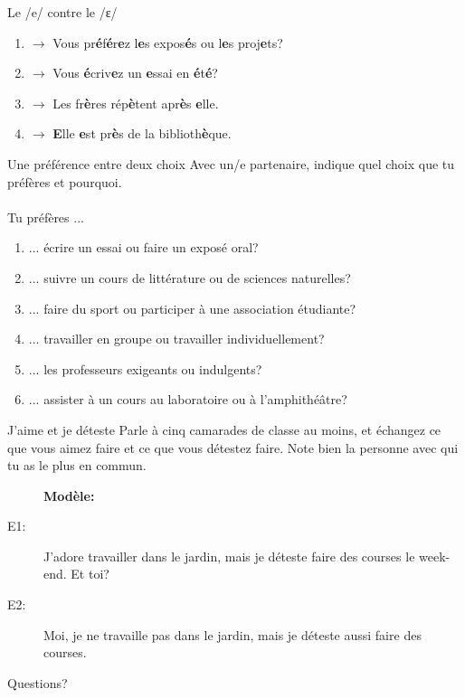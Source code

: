 \documentclass{beamer}
\begin{document}
  \begin{frame}{Le /e/ contre le /ɛ/}
    \begin{enumerate}
      \item[/e/] $\to$ Vous pr\textbf{é}f\textbf{é}r\textbf{e}z l\textbf{e}s expos\textbf{é}s ou l\textbf{e}s proj\textbf{e}ts?
      \item[/e/] $\to$ Vous \textbf{é}criv\textbf{e}z un \textbf{e}ssai en \textbf{é}t\textbf{é}?
      \item[/ɛ/] $\to$ Les fr\textbf{è}res rép\textbf{è}tent apr\textbf{è}s \textbf{e}lle.
      \item[/ɛ/] $\to$ \textbf{E}lle \textbf{e}st pr\textbf{è}s de la biblioth\textbf{è}que.
    \end{enumerate}
  \end{frame}

  \begin{frame}{Une préférence entre deux choix}
    Avec un/e partenaire, indique quel choix que tu préfères et pourquoi. \\
     \\
    \vspace{1cm}
    Tu préfères ...
    \begin{enumerate}
      \item ... écrire un essai ou faire un exposé oral?
      \item ... suivre un cours de littérature ou de sciences naturelles?
      \item ... faire du sport ou participer à une association étudiante?
      \item ... travailler en groupe ou travailler individuellement?
      \item ... les professeurs exigeants  ou indulgents?
      \item ... assister à un cours au laboratoire ou à l'amphithéâtre?
    \end{enumerate}
  \end{frame}

  \begin{frame}{J'aime et je déteste}
    Parle à cinq camarades de classe au moins, et échangez ce que vous aimez faire et ce que vous détestez faire.
    Note bien la personne avec qui tu as le plus en commun. \\
    \begin{center}
      \begin{description}
        \item[] \textbf{Modèle:}
        \item[E1:] J'adore travailler dans le jardin, mais je déteste faire des courses le week-end. Et toi?
        \item[E2:] Moi, je ne travaille pas dans le jardin, mais je déteste aussi faire des courses.
      \end{description}
    \end{center}
  \end{frame}

  \begin{frame}{}
    \begin{center}
      \Large Questions?
    \end{center}
  \end{frame}
\end{document}
